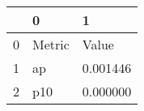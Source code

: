 \begin{tabular}{lll}
\toprule
 & 0 & 1 \\
\midrule
0 & Metric & Value \\
1 & ap & 0.001446 \\
2 & p10 & 0.000000 \\
\bottomrule
\end{tabular}
